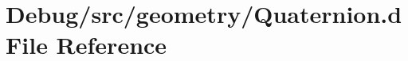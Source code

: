 \hypertarget{_quaternion_8d}{}\section{Debug/src/geometry/\+Quaternion.d File Reference}
\label{_quaternion_8d}
